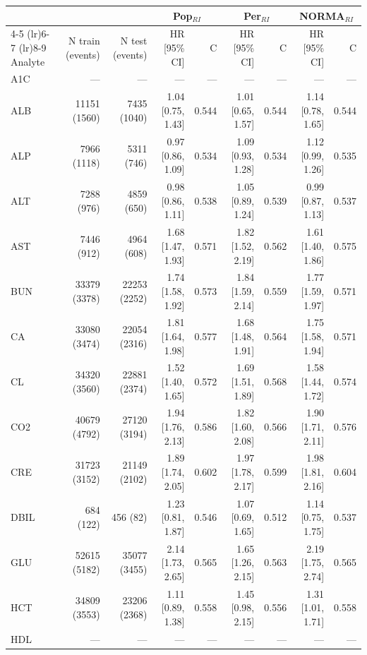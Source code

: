 \begin{table}[ht]
\centering
\footnotesize
\begin{tabular}{lrrrrrrrr}
\toprule
 & &  & \multicolumn{2}{c}{Pop$_{RI}$} & \multicolumn{2}{c}{Per$_{RI}$} & \multicolumn{2}{c}{NORMA$_{RI}$} \\
\cmidrule(lr){4-5} \cmidrule(lr){6-7} \cmidrule(lr){8-9}
Analyte & N train (events) & N test (events) & HR [95\% CI] & C & HR [95\% CI] & C & HR [95\% CI] & C \\
\midrule
A1C & --- & --- & --- & --- & --- & --- & --- & --- \\
ALB & 11151 (1560) & 7435 (1040) & 1.04 [0.75, 1.43] & 0.544 & 1.01 [0.65, 1.57] & 0.544 & 1.14 [0.78, 1.65] & 0.544 \\
ALP & 7966 (1118) & 5311 (746) & 0.97 [0.86, 1.09] & 0.534 & 1.09 [0.93, 1.28] & 0.534 & 1.12 [0.99, 1.26] & 0.535 \\
ALT & 7288 (976) & 4859 (650) & 0.98 [0.86, 1.11] & 0.538 & 1.05 [0.89, 1.24] & 0.539 & 0.99 [0.87, 1.13] & 0.537 \\
AST & 7446 (912) & 4964 (608) & 1.68 [1.47, 1.93] & 0.571 & 1.82 [1.52, 2.19] & 0.562 & 1.61 [1.40, 1.86] & 0.575 \\
BUN & 33379 (3378) & 22253 (2252) & 1.74 [1.58, 1.92] & 0.573 & 1.84 [1.59, 2.14] & 0.559 & 1.77 [1.59, 1.97] & 0.571 \\
CA & 33080 (3474) & 22054 (2316) & 1.81 [1.64, 1.98] & 0.577 & 1.68 [1.48, 1.91] & 0.564 & 1.75 [1.58, 1.94] & 0.571 \\
CL & 34320 (3560) & 22881 (2374) & 1.52 [1.40, 1.65] & 0.572 & 1.69 [1.51, 1.89] & 0.568 & 1.58 [1.44, 1.72] & 0.574 \\
CO2 & 40679 (4792) & 27120 (3194) & 1.94 [1.76, 2.13] & 0.586 & 1.82 [1.60, 2.08] & 0.566 & 1.90 [1.71, 2.11] & 0.576 \\
CRE & 31723 (3152) & 21149 (2102) & 1.89 [1.74, 2.05] & 0.602 & 1.97 [1.78, 2.17] & 0.599 & 1.98 [1.81, 2.16] & 0.604 \\
DBIL & 684 (122) & 456 (82) & 1.23 [0.81, 1.87] & 0.546 & 1.07 [0.69, 1.65] & 0.512 & 1.14 [0.75, 1.75] & 0.537 \\
GLU & 52615 (5182) & 35077 (3455) & 2.14 [1.73, 2.65] & 0.565 & 1.65 [1.26, 2.15] & 0.563 & 2.19 [1.75, 2.74] & 0.565 \\
HCT & 34809 (3553) & 23206 (2368) & 1.11 [0.89, 1.38] & 0.558 & 1.45 [0.98, 2.15] & 0.556 & 1.31 [1.01, 1.71] & 0.558 \\
HDL & --- & --- & --- & --- & --- & --- & --- & --- \\

\end{tabular}
\end{table}
